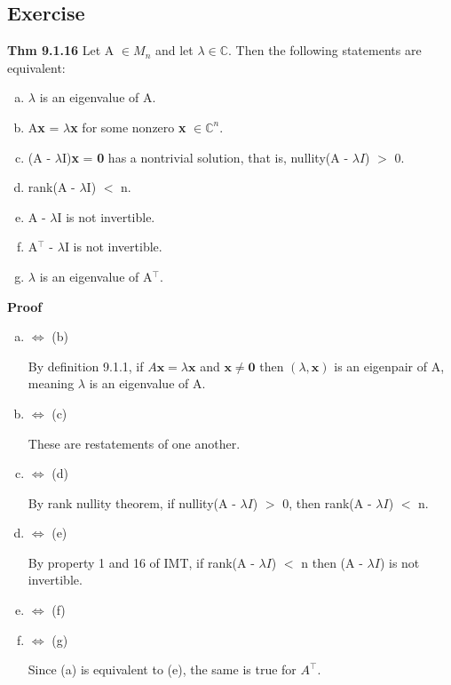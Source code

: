 \documentclass[12pt, letterpaper]{article}
\begin{document}
\subsection{Exercise}
\textbf{Thm 9.1.16} Let A $\in M_n$ and let $\lambda \in \mathbb{C}$. Then the following statements are equivalent:
\begin{enumerate}[(a)]
    \item $\lambda$ is an eigenvalue of A.
    \item A\textbf{x} = $\lambda$\textbf{x} for some nonzero \textbf{x} $\in \mathbb{C}^n$.
    \item (A - $\lambda$I)\textbf{x} = \textbf{0} has a nontrivial solution, that is, nullity(A - $\lambda I$) $>$ 0.
    \item rank(A - $\lambda$I) $<$ n.
    \item A - $\lambda$I is not invertible.
    \item A$^\top$ - $\lambda$I is not invertible.
    \item $\lambda$ is an eigenvalue of A$^\top$.
\end{enumerate}
\textbf{Proof}
\begin{enumerate}[(a)]
    \item $\Leftrightarrow$ (b) 
    
    By definition 9.1.1, if $A\mathbf{x}=\lambda\mathbf{x}$ and $\mathbf{x}\neq\mathbf{0}$ then $(\lambda,\mathbf{x})$
    is an eigenpair of A, meaning $\lambda$ is an eigenvalue of A.
    \item $\Leftrightarrow$ (c)
    
    These are restatements of one another.
    \item $\Leftrightarrow$ (d)
    
    By rank nullity theorem, if nullity(A - $\lambda I$) $>$ 0, then rank(A - $\lambda I$) $<$ n.
    \item $\Leftrightarrow$ (e) 
    
    By property 1 and 16 of IMT, if rank(A - $\lambda I$) $<$ n then (A - $\lambda I$) is not invertible.
    \item $\Leftrightarrow$ (f)
    
    
    \item $\Leftrightarrow$ (g)
    
    Since (a) is equivalent to (e), the same is true for $A^\top$.
\end{enumerate}
\end{document}
